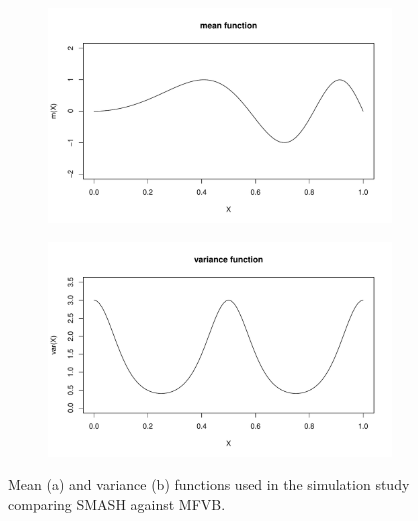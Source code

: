 \documentclass[12pt]{article}
\begin{document}
\begin{figure}[ht]
\centering
    \begin{subfigure}[b]{0.45\textwidth}
        \centering
        \includegraphics[width=\textwidth]{mfvb_mean.pdf}
        \caption{}
        \label{fig:mfvb_mean}
    \end{subfigure}
    \hfill
    \begin{subfigure}[b]{0.45\textwidth}
        \centering
        \includegraphics[width=\textwidth]{mfvb_var.pdf}
        \caption{}
        \label{fig:mfvb_var}
    \end{subfigure}
    \caption{Mean (a) and variance (b) functions used in the simulation study comparing SMASH against MFVB.}
    \label{fig:mfvb_fn}
\end{figure}
\end{document}
